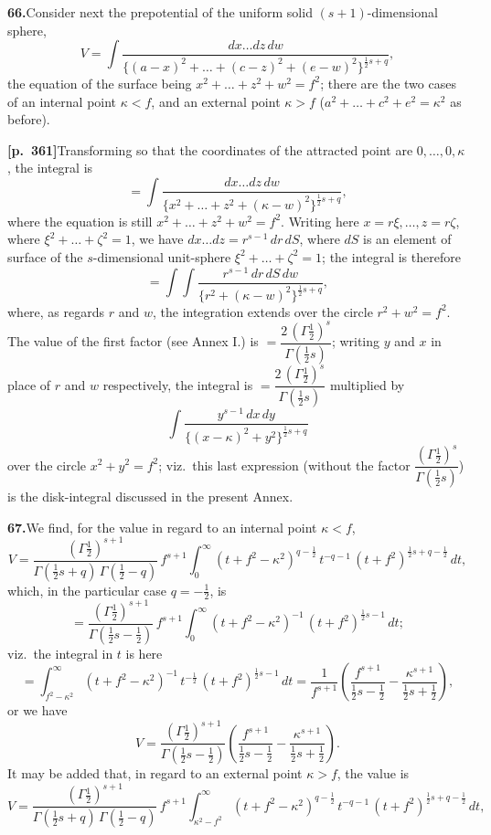 \documentclass[11pt]{article}
\begin{document}
\bigskip

\noindent\textbf{66.}\quad Consider next the prepotential of the uniform solid $(s+1)$-dimensional sphere,
\[
V = \int\frac{dx\ldots dz\,dw}{\{(a-x)^{2}+\ldots+(c-z)^{2}+(e-w)^{2}\}^{\frac{1}{2}s+q}},
\]
the equation of the surface being $x^{2}+\ldots+z^{2}+w^{2}=f^{2}$; there are the two cases of an internal point $\kappa<f$, and an external point $\kappa>f$ ($a^{2}+\ldots+c^{2}+e^{2}=\kappa^{2}$ as before).

\bigskip

\noindent\textbf{[p.~361]}\quad Transforming so that the coordinates of the attracted point are $0,\ldots,0,\kappa$, the integral is
\[
= \int\frac{dx\ldots dz\,dw}{\{x^{2}+\ldots+z^{2}+(\kappa-w)^{2}\}^{\frac{1}{2}s+q}},
\]
where the equation is still $x^{2}+\ldots+z^{2}+w^{2}=f^{2}$. Writing here $x=r\xi,\ldots,z=r\zeta$, where $\xi^{2}+\ldots+\zeta^{2}=1$, we have $dx\ldots dz = r^{s-1}\,dr\,dS$, where $dS$ is an element of surface of the $s$-dimensional unit-sphere $\xi^{2}+\ldots+\zeta^{2}=1$; the integral is therefore
\[
= \int\int\frac{r^{s-1}\,dr\,dS\,dw}{\{r^{2}+(\kappa-w)^{2}\}^{\frac{1}{2}s+q}},
\]
where, as regards $r$ and $w$, the integration extends over the circle $r^{2}+w^{2}=f^{2}$. The value of the first factor (see Annex I.) is $=\dfrac{2\,(\Gamma\tfrac{1}{2})^{s}}{\Gamma(\tfrac{1}{2}s)}$; writing $y$ and $x$ in place of $r$ and $w$ respectively, the integral is $=\dfrac{2\,(\Gamma\tfrac{1}{2})^{s}}{\Gamma(\tfrac{1}{2}s)}$ multiplied by
\[
\int\frac{y^{s-1}\,dx\,dy}{\{(x-\kappa)^{2}+y^{2}\}^{\frac{1}{2}s+q}}
\]
over the circle $x^{2}+y^{2}=f^{2}$; viz.\ this last expression (without the factor $\dfrac{(\Gamma\tfrac{1}{2})^{s}}{\Gamma(\tfrac{1}{2}s)}$) is the disk-integral discussed in the present Annex.

\bigskip

\noindent\textbf{67.}\quad We find, for the value in regard to an internal point $\kappa<f$,
\[
V = \frac{(\Gamma\tfrac{1}{2})^{s+1}}{\Gamma(\tfrac{1}{2}s+q)\,\Gamma(\tfrac{1}{2}-q)}\,f^{s+1}\int_{0}^{\infty}(t+f^{2}-\kappa^{2})^{q-\frac{1}{2}}\,t^{-q-1}\,(t+f^{2})^{\frac{1}{2}s+q-\frac{1}{2}}\,dt,
\]
which, in the particular case $q=-\tfrac{1}{2}$, is
\[
= \frac{(\Gamma\tfrac{1}{2})^{s+1}}{\Gamma(\tfrac{1}{2}s-\tfrac{1}{2})}\,f^{s+1}\int_{0}^{\infty}(t+f^{2}-\kappa^{2})^{-1}\,(t+f^{2})^{\frac{1}{2}s-1}\,dt;
\]
viz.\ the integral in $t$ is here
\[
= \int_{f^{2}-\kappa^{2}}^{\infty}(t+f^{2}-\kappa^{2})^{-1}\,t^{-\frac{1}{2}}\,(t+f^{2})^{\frac{1}{2}s-1}\,dt
= \frac{1}{f^{s+1}}\left(\frac{f^{s+1}}{\tfrac{1}{2}s-\tfrac{1}{2}} - \frac{\kappa^{s+1}}{\tfrac{1}{2}s+\tfrac{1}{2}}\right),
\]
or we have
\[
V = \frac{(\Gamma\tfrac{1}{2})^{s+1}}{\Gamma(\tfrac{1}{2}s-\tfrac{1}{2})}\left(\frac{f^{s+1}}{\tfrac{1}{2}s-\tfrac{1}{2}} - \frac{\kappa^{s+1}}{\tfrac{1}{2}s+\tfrac{1}{2}}\right).
\]
It may be added that, in regard to an external point $\kappa>f$, the value is
\[
V = \frac{(\Gamma\tfrac{1}{2})^{s+1}}{\Gamma(\tfrac{1}{2}s+q)\,\Gamma(\tfrac{1}{2}-q)}\,f^{s+1}\int_{\kappa^{2}-f^{2}}^{\infty}(t+f^{2}-\kappa^{2})^{q-\frac{1}{2}}\,t^{-q-1}\,(t+f^{2})^{\frac{1}{2}s+q-\frac{1}{2}}\,dt,
\]
\end{document}
